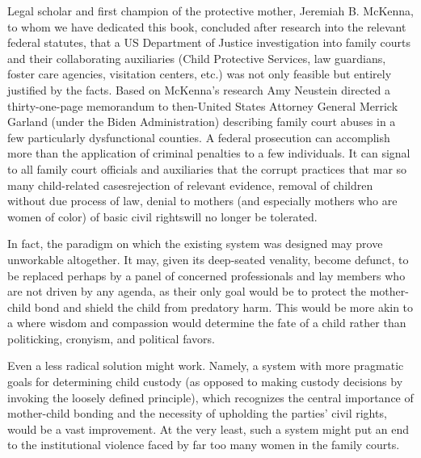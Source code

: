 Legal scholar and first champion of the protective mother, Jeremiah
B. McKenna, to whom we have dedicated this book, concluded after
research into the relevant federal statutes, that a US Department of 
Justice investigation into family courts and their collaborating auxiliaries
(Child Protective Services, law guardians, foster care agencies, 
visitation centers, etc.) was not only feasible but entirely justified by the facts.
Based on McKenna’s research Amy Neustein directed a thirty-one-page
memorandum to then-United States Attorney General Merrick Garland
(under the Biden Administration) describing family court abuses in
a few particularly dysfunctional counties. A federal prosecution can
accomplish more than the application of criminal penalties to a few individuals. 
It can signal to all family court officials and auxiliaries that the
corrupt practices that mar so many child-related cases\mdash{}rejection of 
relevant evidence, removal of children without due process of law, denial
to mothers (and especially mothers who are women of color) of basic
civil rights\mdash{}will no longer be tolerated. \pfl{}

In fact, the paradigm on which the existing system was designed
may prove unworkable altogether. It may, given its deep-seated venality,
become defunct, to be replaced perhaps by a panel of concerned 
professionals and lay members who are not driven by any agenda, as their only
goal would be to protect the mother-child bond and shield the child
from predatory harm. This would be more akin to a \mdash{}where wisdom and compassion would determine the fate of a
child rather than politicking, cronyism, and political favors. \pfl{}

Even a less radical solution might work. Namely, a system with more
pragmatic goals for determining child custody (as opposed to making
custody decisions by invoking the loosely defined  
principle), which recognizes the central importance of mother-child bonding
and the necessity of upholding the parties' civil rights, would be a vast
improvement. At the very least, such a system might put an end to
the institutional violence faced by far too many women in the family
courts. \pfl{}





